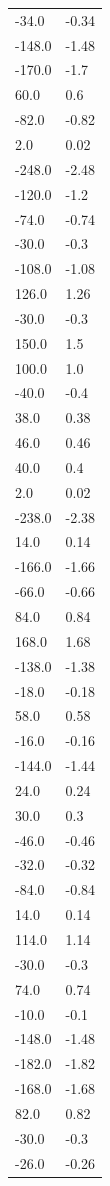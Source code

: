 \begin{longtable}{ll}
-34.0 & -0.34 \\
-148.0 & -1.48 \\
-170.0 & -1.7 \\
60.0 & 0.6 \\
-82.0 & -0.82 \\
2.0 & 0.02 \\
-248.0 & -2.48 \\
-120.0 & -1.2 \\
-74.0 & -0.74 \\
-30.0 & -0.3 \\
-108.0 & -1.08 \\
126.0 & 1.26 \\
-30.0 & -0.3 \\
150.0 & 1.5 \\
100.0 & 1.0 \\
-40.0 & -0.4 \\
38.0 & 0.38 \\
46.0 & 0.46 \\
40.0 & 0.4 \\
2.0 & 0.02 \\
-238.0 & -2.38 \\
14.0 & 0.14 \\
-166.0 & -1.66 \\
-66.0 & -0.66 \\
84.0 & 0.84 \\
168.0 & 1.68 \\
-138.0 & -1.38 \\
-18.0 & -0.18 \\
58.0 & 0.58 \\
-16.0 & -0.16 \\
-144.0 & -1.44 \\
24.0 & 0.24 \\
30.0 & 0.3 \\
-46.0 & -0.46 \\
-32.0 & -0.32 \\
-84.0 & -0.84 \\
14.0 & 0.14 \\
114.0 & 1.14 \\
-30.0 & -0.3 \\
74.0 & 0.74 \\
-10.0 & -0.1 \\
-148.0 & -1.48 \\
-182.0 & -1.82 \\
-168.0 & -1.68 \\
82.0 & 0.82 \\
-30.0 & -0.3 \\
-26.0 & -0.26 \\

\end{longtable}
